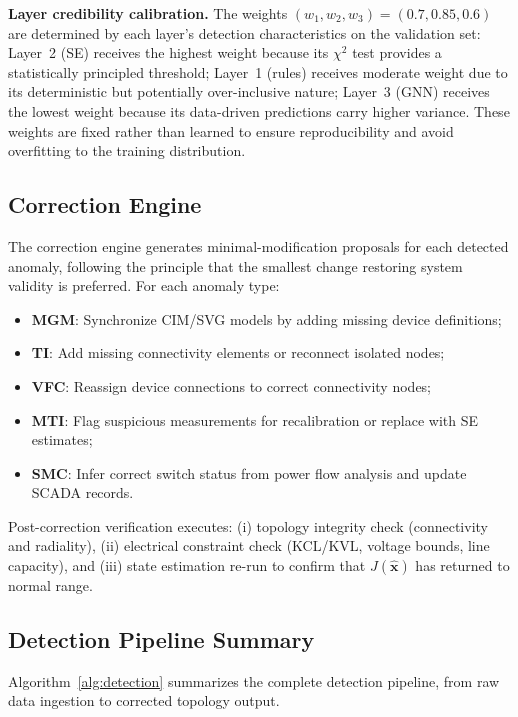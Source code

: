 \documentclass[research]{fcs}
\begin{document}
\textbf{Layer credibility calibration.} The weights $(w_1, w_2, w_3) = (0.7, 0.85, 0.6)$ are determined by each layer's detection characteristics on the validation set: Layer~2 (SE) receives the highest weight because its $\chi^2$ test provides a statistically principled threshold; Layer~1 (rules) receives moderate weight due to its deterministic but potentially over-inclusive nature; Layer~3 (GNN) receives the lowest weight because its data-driven predictions carry higher variance. These weights are fixed rather than learned to ensure reproducibility and avoid overfitting to the training distribution.

\subsection{Correction Engine}

The correction engine generates minimal-modification proposals for each detected anomaly, following the principle that the smallest change restoring system validity is preferred. For each anomaly type:
\begin{itemize}
\item \textbf{MGM}: Synchronize CIM/SVG models by adding missing device definitions;
\item \textbf{TI}: Add missing connectivity elements or reconnect isolated nodes;
\item \textbf{VFC}: Reassign device connections to correct connectivity nodes;
\item \textbf{MTI}: Flag suspicious measurements for recalibration or replace with SE estimates;
\item \textbf{SMC}: Infer correct switch status from power flow analysis and update SCADA records.
\end{itemize}

Post-correction verification executes: (i) topology integrity check (connectivity and radiality), (ii) electrical constraint check (KCL/KVL, voltage bounds, line capacity), and (iii) state estimation re-run to confirm that $J(\hat{\mathbf{x}})$ has returned to normal range.

\subsection{Detection Pipeline Summary}

Algorithm~\ref{alg:detection} summarizes the complete detection pipeline, from raw data ingestion to corrected topology output.
\end{document}
